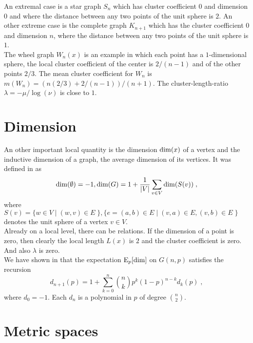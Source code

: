 \documentclass[12pt]{amsart}
\theoremstyle{definition}
\def\B#1#2{{#1\choose #2}}
\begin{document}
An extremal case is a star graph $S_n$ which has cluster coefficient $0$ and dimension $0$
and where the distance between any two points of the unit sphere is $2$. 
An other extreme case is the complete graph $K_{n+1}$ which has the cluster coefficient $0$
and dimension $n$, where the distance between any two points of the unit sphere is $1$.  \\

The wheel graph $W_n(x)$ is an example in which each point has a $1$-dimensional sphere,
the local cluster coefficient of the center is $2/(n-1)$ and of the other points $2/3$. 
The mean cluster coefficient for $W_n$ is $m(W_n) = (n (2/3) + 2/(n-1) )/(n+1)$. 
The cluster-length-ratio $\lambda=-\mu/\log(\nu)$ is close to $1$. 

\section{Dimension} 

An other important local quantity is the dimension ${\rm dim}(x)$ of a vertex
and the inductive dimension of a graph, the average dimension of its vertices. 
It was defined in \cite{elemente11} as
$$ {\rm dim}(\emptyset)= -1, {\rm dim}(G) = 1+\frac{1}{|V|} \sum_{v \in V} {\rm dim}(S(v))  \; ,  $$
where $S(v)=\{ w \in V \; | \; (w,v) \in E \; \}, \{ e=(a,b) \in E \; | 
 \; (v,a) \in E, (v,b) \in E \; \}$ 
denotes the unit sphere of a vertex $v \in V$. \\

Already on a local level, there can be relations. If the dimension of a point is zero, 
then clearly the local length $L(x)$ is $2$ and the cluster coefficient is zero. And
also $\lambda$ is zero.  \\
We have shown in \cite{randomgraph} 
that the expectation ${\rm E}_p[{\rm dim}]$ on $G(n,p)$ satisfies the recursion 
$$ d_{n+1}(p) = 1+\sum_{k=0}^n \B{n}{k} p^k (1-p)^{n-k} d_k(p) \; , $$
where $d_0=-1$. Each $d_n$ is a polynomial in $p$ of degree $\B{n}{2}$.

\section{Metric spaces}
\end{document}
